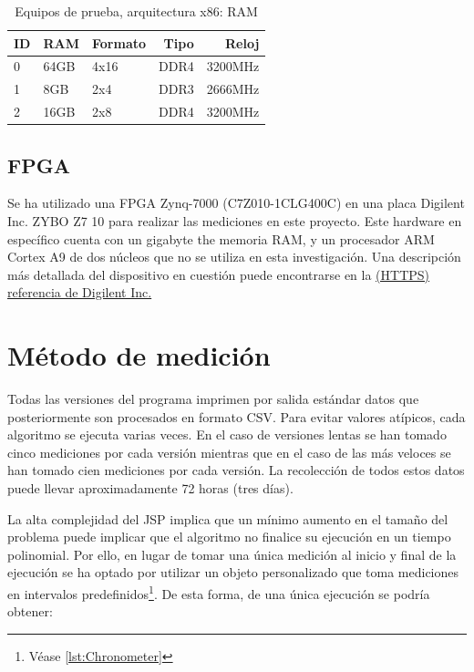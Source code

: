 \begin{center}
    \begin{table}[h]
        \centering
        \begin{tabular}{ l | l l r r}
            \hline
            ID & RAM & Formato & Tipo & Reloj \\
            \hline
            0 & 64GB & 4x16 & DDR4 & 3200MHz \\
            1 & 8GB & 2x4 & DDR3 & 2666MHz \\
            2 & 16GB & 2x8 & DDR4 & 3200MHz \\
            \hline
        \end{tabular}
        \caption{Equipos de prueba, arquitectura x86: RAM}
    \end{table}
\end{center}

\pagebreak
\subsection{FPGA}

Se ha utilizado una FPGA Zynq-7000 (C7Z010-1CLG400C)
en una placa Digilent Inc. ZYBO Z7 10 para realizar las mediciones
en este proyecto.
Este hardware en específico cuenta con un gigabyte the memoria RAM,
y un procesador ARM Cortex A9 de dos núcleos
que no se utiliza en esta investigación.
Una descripción más detallada del dispositivo en cuestión
puede encontrarse en la
\href{
    https://digilent.com/reference/programmable-logic/zybo-z7/start?redirect=1
}{
    (HTTPS) referencia de Digilent Inc.
}


\section{Método de medición}

Todas las versiones del programa imprimen por salida estándar datos que posteriormente
son procesados en formato CSV.
Para evitar valores atípicos, cada algoritmo se ejecuta varias veces.
En el caso de versiones lentas se han tomado cinco mediciones por cada versión
mientras que en el caso de las más veloces se han tomado cien mediciones por cada versión.
La recolección de todos estos datos puede llevar aproximadamente 72 horas (tres días).

La alta complejidad del JSP implica que un mínimo aumento en el tamaño del problema
puede implicar que el algoritmo no finalice su ejecución en un tiempo polinomial.
Por ello, en lugar de tomar una única medición al inicio y final de la ejecución
se ha optado por utilizar un objeto personalizado que toma mediciones en intervalos
predefinidos\footnote{Véase \ref{lst:Chronometer}}.
De esta forma, de una única ejecución se podría obtener:

